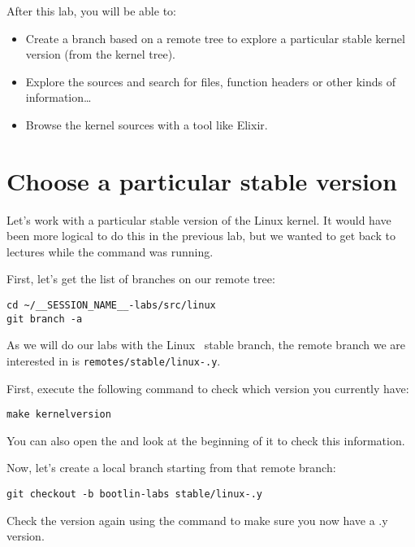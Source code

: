 
After this lab, you will be able to:

\begin{itemize}

\item Create a branch based on a remote tree to explore a particular
      stable kernel version (from the  kernel tree).
\item Explore the sources and search for files, function headers or
  other kinds of information\ldots
\item Browse the kernel sources with a tool like Elixir.
\end{itemize}

\section{Choose a particular stable version}

Let's work with a particular stable version of the Linux kernel.
It would have been more logical to do this in the previous lab, but we
wanted to get back to lectures while the  command was
running.

First, let's get the list of branches on our  remote tree:

\begin{verbatim}
cd ~/__SESSION_NAME__-labs/src/linux
git branch -a
\end{verbatim}

As we will do our labs with the Linux \workingkernel\ stable branch, the remote branch
we are interested in is \texttt{remotes/stable/linux-\workingkernel.y}.

First, execute the following command to check which version you
currently have:

\begin{verbatim}
make kernelversion
\end{verbatim}

You can also open the  and look at the beginning of it
to check this information.

Now, let's create a local branch starting from that remote branch:

\texttt{git checkout -b bootlin-labs stable/linux-\workingkernel.y}

Check the version again using the  command
to make sure you now have a \workingkernel.y version.

